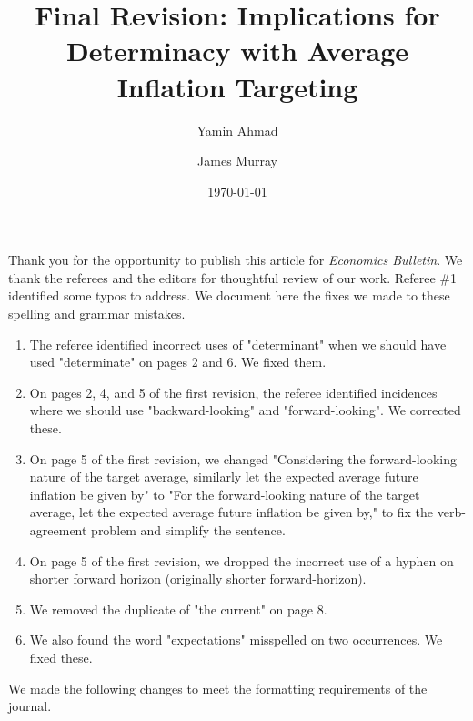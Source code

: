 \documentclass[english,authoryear,12pt]{elsarticle}
\def\baselinestretch{1}%
\def\baselinestretch{1}%
\gdef\thefootnote{\arabic{footnote}}%
\begin{document}
	\begin{frontmatter}
		\title{Final Revision: Implications for Determinacy with Average Inflation Targeting}
		\date{\today}
		\author[1]{Yamin Ahmad}
		\author[2]{James Murray}

		\address[1]{Dept. of Economics, University of Wisconsin - Whitewater, 809 W. Starin Road, Whitewater, WI 53190, USA}
		\address[2]{Dept. of Economics, University of Wisconsin - La Crosse, 1725 State St., La Crosse, WI 54601, USA}

\end{frontmatter}

\renewcommand{\thefootnote}{\arabic{footnote}}%
\setcounter{page}{1}%
\setcounter{footnote}{0}%

Thank you for the opportunity to publish this article for \textit{Economics Bulletin}. We thank the referees and the editors for thoughtful review of our work. Referee \#1 identified some typos to address. We document here the fixes we made to these spelling and grammar mistakes.

\begin{enumerate}
    \item The referee identified incorrect uses of "determinant" when we should have used "determinate" on pages 2 and 6. We fixed them.
    \item On pages 2, 4, and 5 of the first revision, the referee identified incidences where we should use "backward-looking" and "forward-looking". We corrected these.
    \item On page 5 of the first revision, we changed "Considering the forward-looking nature of the target average, similarly let the expected average future inflation be given by" to "For the forward-looking nature of the target average, let the expected average future inflation be given by," to fix the verb-agreement problem and simplify the sentence.
    \item On page 5 of the first revision, we dropped the incorrect use of a hyphen on shorter forward horizon (originally shorter forward-horizon).
    \item We removed the duplicate of "the current" on page 8.
    \item We also found the word "expectations" misspelled on two occurrences. We fixed these.
\end{enumerate}

We made the following changes to meet the formatting requirements of the journal.
\end{document}
